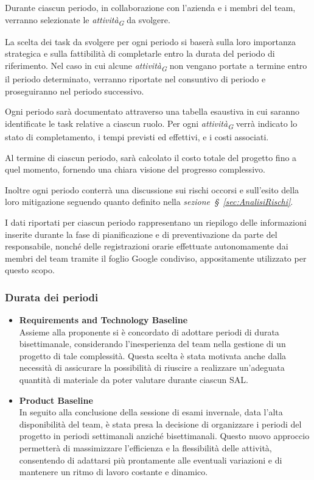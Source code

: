 Durante ciascun periodo, in collaborazione con l'azienda e i membri del team, verranno selezionate le \textit{attività}\textsubscript{\textit{G}} da svolgere.

La scelta dei task da svolgere per ogni periodo si baserà sulla loro importanza strategica e sulla fattibilità di completarle entro la durata del periodo di riferimento. Nel caso in cui alcune \textit{attività}\textsubscript{\textit{G}} non vengano portate a termine entro il periodo determinato, verranno riportate nel consuntivo di periodo e proseguiranno nel periodo successivo.

Ogni periodo sarà documentato attraverso una tabella esaustiva in cui saranno identificate le task relative a ciascun ruolo. Per ogni \textit{attività}\textsubscript{\textit{G}} verrà indicato lo stato di completamento, i tempi previsti ed effettivi, e i costi associati.

Al termine di ciascun periodo, sarà calcolato il costo totale del progetto fino a quel momento, fornendo una chiara visione del progresso complessivo.

Inoltre ogni periodo conterrà una discussione sui rischi occorsi e sull'esito della loro mitigazione seguendo quanto definito nella \textit{sezione~\S~\ref{sec:AnalisiRischi}}.

I dati riportati per ciascun periodo rappresentano un riepilogo delle informazioni inserite durante la fase di pianificazione e di preventivazione da parte del responsabile, nonché delle registrazioni orarie effettuate autonomamente dai membri del team tramite il foglio Google condiviso, appositamente utilizzato per questo scopo.

\subsubsection{Durata dei periodi}
\begin{itemize}
    \item \textbf{Requirements and Technology Baseline} \\
    Assieme alla proponente si è concordato di adottare periodi di durata bisettimanale, considerando l'inesperienza del team nella gestione di un progetto di tale complessità. Questa scelta è stata motivata anche dalla necessità di assicurare la possibilità di riuscire a realizzare un'adeguata quantità di materiale da poter valutare durante ciascun SAL.
    \item \textbf{Product Baseline} \\
    In seguito alla conclusione della sessione di esami invernale, data l'alta disponibilità del team, è stata presa la decisione di organizzare i periodi del progetto in periodi settimanali anziché bisettimanali. Questo nuovo approccio permetterà di massimizzare l'efficienza e la flessibilità delle attività, consentendo di adattarsi più prontamente alle eventuali variazioni e di mantenere un ritmo di lavoro costante e dinamico.
\end{itemize}

